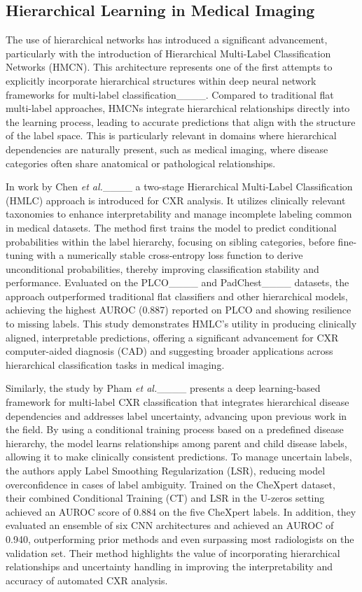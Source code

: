 \subsection{Hierarchical Learning in Medical Imaging}
The use of hierarchical networks has introduced a significant advancement, particularly with the introduction of Hierarchical Multi-Label Classification Networks (HMCN). This architecture represents one of the first attempts to explicitly incorporate hierarchical structures within deep neural network frameworks for multi-label classification____. Compared to traditional flat multi-label approaches, HMCNs integrate hierarchical relationships directly into the learning process, leading to accurate predictions that align with the structure of the label space. This is particularly relevant in domains where hierarchical dependencies are naturally present, such as medical imaging, where disease categories often share anatomical or pathological relationships.

In work by Chen \textit{et al.}____ a two-stage Hierarchical Multi-Label Classification (HMLC) approach is introduced for CXR analysis. It utilizes clinically relevant taxonomies to enhance interpretability and manage incomplete labeling common in medical datasets. The method first trains the model to predict conditional probabilities within the label hierarchy, focusing on sibling categories, before fine-tuning with a numerically stable cross-entropy loss function to derive unconditional probabilities, thereby improving classification stability and performance. Evaluated on the PLCO____ and PadChest____ datasets, the approach outperformed traditional flat classifiers and other hierarchical models, achieving the highest AUROC (0.887) reported on PLCO and showing resilience to missing labels. This study demonstrates HMLC’s utility in producing clinically aligned, interpretable predictions, offering a significant advancement for CXR computer-aided diagnosis (CAD) and suggesting broader applications across hierarchical classification tasks in medical imaging.

Similarly, the study by Pham \textit{et al.}____ presents a deep learning-based framework for multi-label CXR classification that integrates hierarchical disease dependencies and addresses label uncertainty, advancing upon previous work in the field. By using a conditional training process based on a predefined disease hierarchy, the model learns relationships among parent and child disease labels, allowing it to make clinically consistent predictions. To manage uncertain labels, the authors apply Label Smoothing Regularization (LSR), reducing model overconfidence in cases of label ambiguity. Trained on the CheXpert dataset, their combined Conditional Training (CT) and LSR in the U-zeros setting achieved an AUROC score of 0.884 on the five CheXpert labels. In addition, they evaluated an ensemble of six CNN architectures and achieved an AUROC of 0.940, outperforming prior methods and even surpassing most radiologists on the validation set. Their method highlights the value of incorporating hierarchical relationships and uncertainty handling in improving the interpretability and accuracy of automated CXR analysis.

